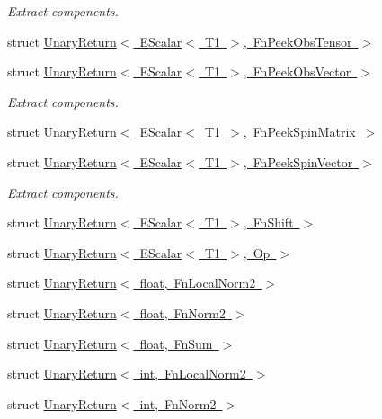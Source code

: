 \begin{DoxyCompactItemize}
\begin{DoxyCompactList}\small\item\em Extract components. \end{DoxyCompactList}\item 
struct \mbox{\hyperlink{structENSEM_1_1UnaryReturn_3_01EScalar_3_01T1_01_4_00_01FnPeekObsTensor_01_4}{Unary\+Return$<$ E\+Scalar$<$ T1 $>$, Fn\+Peek\+Obs\+Tensor $>$}}
\item 
struct \mbox{\hyperlink{structENSEM_1_1UnaryReturn_3_01EScalar_3_01T1_01_4_00_01FnPeekObsVector_01_4}{Unary\+Return$<$ E\+Scalar$<$ T1 $>$, Fn\+Peek\+Obs\+Vector $>$}}
\begin{DoxyCompactList}\small\item\em Extract components. \end{DoxyCompactList}\item 
struct \mbox{\hyperlink{structENSEM_1_1UnaryReturn_3_01EScalar_3_01T1_01_4_00_01FnPeekSpinMatrix_01_4}{Unary\+Return$<$ E\+Scalar$<$ T1 $>$, Fn\+Peek\+Spin\+Matrix $>$}}
\item 
struct \mbox{\hyperlink{structENSEM_1_1UnaryReturn_3_01EScalar_3_01T1_01_4_00_01FnPeekSpinVector_01_4}{Unary\+Return$<$ E\+Scalar$<$ T1 $>$, Fn\+Peek\+Spin\+Vector $>$}}
\begin{DoxyCompactList}\small\item\em Extract components. \end{DoxyCompactList}\item 
struct \mbox{\hyperlink{structENSEM_1_1UnaryReturn_3_01EScalar_3_01T1_01_4_00_01FnShift_01_4}{Unary\+Return$<$ E\+Scalar$<$ T1 $>$, Fn\+Shift $>$}}
\item 
struct \mbox{\hyperlink{structENSEM_1_1UnaryReturn_3_01EScalar_3_01T1_01_4_00_01Op_01_4}{Unary\+Return$<$ E\+Scalar$<$ T1 $>$, Op $>$}}
\item 
struct \mbox{\hyperlink{structENSEM_1_1UnaryReturn_3_01float_00_01FnLocalNorm2_01_4}{Unary\+Return$<$ float, Fn\+Local\+Norm2 $>$}}
\item 
struct \mbox{\hyperlink{structENSEM_1_1UnaryReturn_3_01float_00_01FnNorm2_01_4}{Unary\+Return$<$ float, Fn\+Norm2 $>$}}
\item 
struct \mbox{\hyperlink{structENSEM_1_1UnaryReturn_3_01float_00_01FnSum_01_4}{Unary\+Return$<$ float, Fn\+Sum $>$}}
\item 
struct \mbox{\hyperlink{structENSEM_1_1UnaryReturn_3_01int_00_01FnLocalNorm2_01_4}{Unary\+Return$<$ int, Fn\+Local\+Norm2 $>$}}
\item 
struct \mbox{\hyperlink{structENSEM_1_1UnaryReturn_3_01int_00_01FnNorm2_01_4}{Unary\+Return$<$ int, Fn\+Norm2 $>$}}

\end{DoxyCompactItemize}
